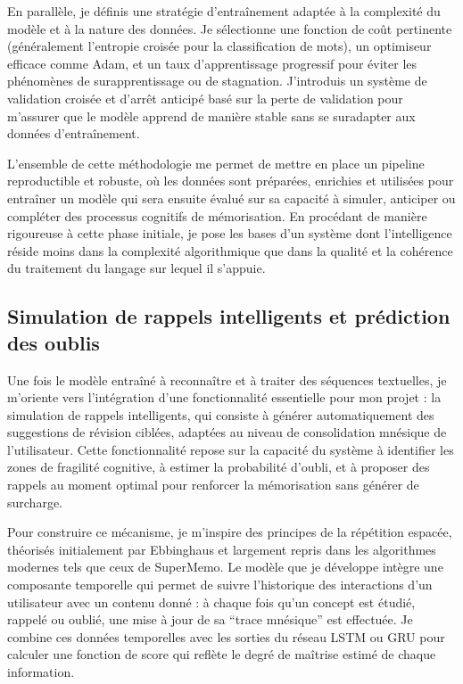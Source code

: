 \documentclass[11pt,a4paper]{report}
\begin{document}
En parallèle, je définis une stratégie d’entraînement adaptée à la complexité du modèle et à la nature des données. Je sélectionne une fonction de coût pertinente (généralement l’entropie croisée pour la classification de mots), un optimiseur efficace comme Adam, et un taux d’apprentissage progressif pour éviter les phénomènes de surapprentissage ou de stagnation. J’introduis un système de validation croisée et d’arrêt anticipé basé sur la perte de validation pour m’assurer que le modèle apprend de manière stable sans se suradapter aux données d’entraînement.

L’ensemble de cette méthodologie me permet de mettre en place un pipeline reproductible et robuste, où les données sont préparées, enrichies et utilisées pour entraîner un modèle qui sera ensuite évalué sur sa capacité à simuler, anticiper ou compléter des processus cognitifs de mémorisation. En procédant de manière rigoureuse à cette phase initiale, je pose les bases d’un système dont l’intelligence réside moins dans la complexité algorithmique que dans la qualité et la cohérence du traitement du langage sur lequel il s’appuie.

\subsection{Simulation de rappels intelligents et prédiction des oublis}

Une fois le modèle entraîné à reconnaître et à traiter des séquences textuelles, je m’oriente vers l’intégration d’une fonctionnalité essentielle pour mon projet : la simulation de rappels intelligents, qui consiste à générer automatiquement des suggestions de révision ciblées, adaptées au niveau de consolidation mnésique de l’utilisateur. Cette fonctionnalité repose sur la capacité du système à identifier les zones de fragilité cognitive, à estimer la probabilité d’oubli, et à proposer des rappels au moment optimal pour renforcer la mémorisation sans générer de surcharge.

Pour construire ce mécanisme, je m’inspire des principes de la répétition espacée, théorisés initialement par Ebbinghaus et largement repris dans les algorithmes modernes tels que ceux de SuperMemo. Le modèle que je développe intègre une composante temporelle qui permet de suivre l’historique des interactions d’un utilisateur avec un contenu donné : à chaque fois qu’un concept est étudié, rappelé ou oublié, une mise à jour de sa “trace mnésique” est effectuée. Je combine ces données temporelles avec les sorties du réseau LSTM ou GRU pour calculer une fonction de score qui reflète le degré de maîtrise estimé de chaque information.
\end{document}
